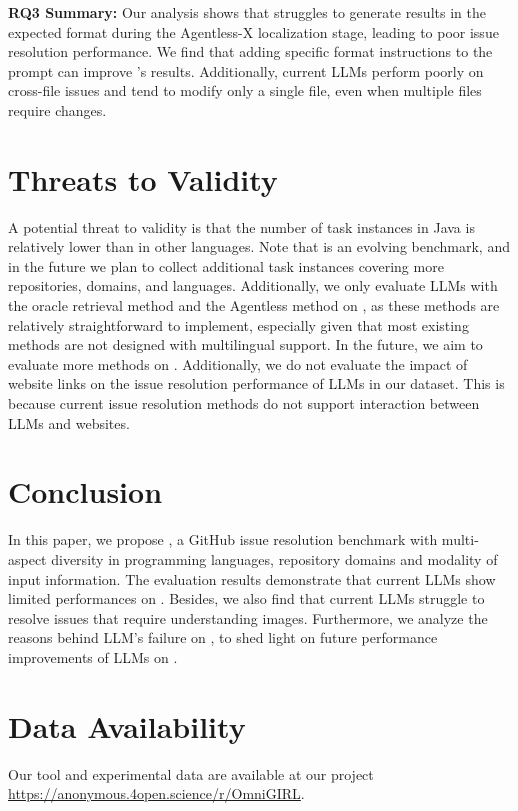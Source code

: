 \begin{center}
    \begin{myboxc} \textbf{RQ3 Summary: } Our analysis shows that \Claude struggles to generate results in the expected format during the Agentless-X localization stage, leading to poor issue resolution performance. We find that adding specific format instructions to the prompt can improve \Claude's results. Additionally, current LLMs perform poorly on cross-file issues and tend to modify only a single file, even when multiple files require changes.
    \end{myboxc} %
\end{center}

\secmargin
\section{Threats to Validity}
A potential threat to validity is that the number of task instances in Java is relatively lower than in other languages. Note that \Swebenchx is an evolving benchmark, and in the future we plan to collect additional task instances covering more repositories, domains, and languages. Additionally, we only evaluate  LLMs with the oracle retrieval method and the Agentless method on \Swebenchx, as these methods are relatively straightforward to implement, especially given that most existing methods are not designed with multilingual support. In the future, we aim to evaluate more methods on \Swebenchx. Additionally, we do not evaluate the impact of website links on the issue resolution performance of LLMs in our dataset. This is because current issue resolution methods do not support interaction between LLMs and websites.

\secmargin
\section{Conclusion}

In this paper, we propose \Swebenchx, a GitHub issue resolution benchmark with multi-aspect
diversity in programming languages, repository domains and modality of input information. The evaluation results demonstrate that current LLMs show limited performances on \Swebenchx. Besides, we also find that current LLMs struggle to resolve issues that require understanding images. Furthermore, we analyze the reasons behind LLM's failure on \Swebenchx, to shed light on future performance improvements of LLMs on \Swebenchx. 

\secmargin
\section{Data Availability}
\label{sec:open-science}
Our tool and experimental data are available at our project \url{https://anonymous.4open.science/r/OmniGIRL}.


